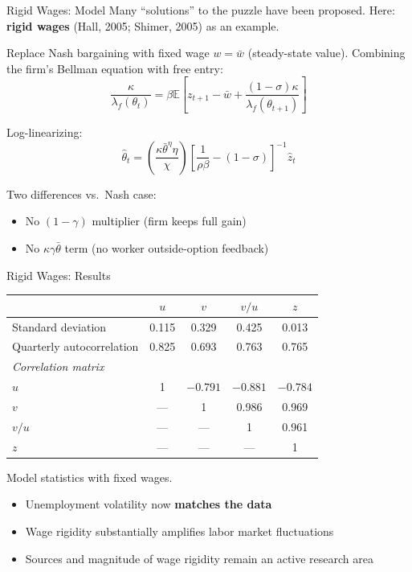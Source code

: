 \documentclass[blue]{beamer}
\newcommand{\E}{\mathbb{E}}
\begin{document}
\begin{frame}{Rigid Wages: Model}
	Many ``solutions'' to the puzzle have been proposed. Here: \textbf{rigid wages} (Hall, 2005; Shimer, 2005) as an example.
	
	\medskip
	Replace Nash bargaining with fixed wage $w = \bar{w}$ (steady-state value). Combining the firm's Bellman equation with free entry:
	\[
	\frac{\kappa}{\lambda_f(\theta_t)} = \beta \E\!\left[z_{t+1} - \bar{w} + \frac{(1 - \sigma) \kappa}{\lambda_f(\theta_{t+1})}\right]
	\]
	
	Log-linearizing:
	\[
	{\hat\theta_t = \left(\frac{\kappa \bar\theta^\eta \eta}{\chi}\right)\! \left[\frac{1}{\rho \beta} - (1 - \sigma)\right]^{-1} \!\hat{z}_t}
	\]
	
	\medskip
	Two differences vs.\ Nash case:
	\begin{itemize}
		\item No $(1 - \gamma)$ multiplier (firm keeps full gain)
		\item No $\kappa \gamma \bar\theta$ term (no worker outside-option feedback)
	\end{itemize}
\end{frame}

\begin{frame}{Rigid Wages: Results}
	\begin{table}
		\centering
		\small
		\begin{tabular}{lcccc}
			\toprule
			& $u$ & $v$ & $v/u$ & $z$ \\
			\midrule
			Standard deviation & 0.115 & 0.329 & 0.425 & 0.013 \\
			Quarterly autocorrelation & 0.825 & 0.693 & 0.763 & 0.765 \\
			\midrule
			\multicolumn{5}{l}{\textit{Correlation matrix}} \\
			$u$ & 1 & $-0.791$ & $-0.881$ & $-0.784$ \\
			$v$ & --- & 1 & 0.986 & 0.969 \\
			$v/u$ & --- & --- & 1 & 0.961 \\
			$z$ & --- & --- & --- & 1 \\
			\bottomrule
		\end{tabular}
		
		 Model statistics with fixed wages.
	\end{table}
	
	\begin{itemize}
		\item Unemployment volatility now \textbf{matches the data}
		\item Wage rigidity substantially amplifies labor market fluctuations
		\item Sources and magnitude of wage rigidity remain an active research area
	\end{itemize}
\end{frame}
\end{document}
